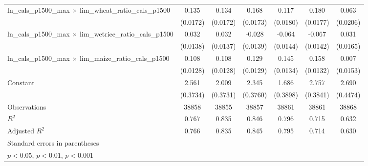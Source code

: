 {\begin{tabular}{l*{6}{c}}
\addlinespace
ln\_cals\_p1500\_max $\times$ lim\_wheat\_ratio\_cals\_p1500&       0.135\sym{***}&       0.134\sym{***}&       0.168\sym{***}&       0.117\sym{***}&       0.180\sym{***}&       0.063\sym{**} \\
                    &    (0.0172)         &    (0.0172)         &    (0.0173)         &    (0.0180)         &    (0.0177)         &    (0.0206)         \\
\addlinespace
ln\_cals\_p1500\_max $\times$ lim\_wetrice\_ratio\_cals\_p1500&       0.032\sym{*}  &       0.032\sym{*}  &      -0.028\sym{*}  &      -0.064\sym{***}&      -0.067\sym{***}&       0.031         \\
                    &    (0.0138)         &    (0.0137)         &    (0.0139)         &    (0.0144)         &    (0.0142)         &    (0.0165)         \\
\addlinespace
ln\_cals\_p1500\_max $\times$ lim\_maize\_ratio\_cals\_p1500&       0.108\sym{***}&       0.108\sym{***}&       0.129\sym{***}&       0.145\sym{***}&       0.158\sym{***}&       0.007         \\
                    &    (0.0128)         &    (0.0128)         &    (0.0129)         &    (0.0134)         &    (0.0132)         &    (0.0153)         \\
\addlinespace
Constant            &       2.561\sym{***}&       2.009\sym{***}&       2.345\sym{***}&       1.686\sym{***}&       2.757\sym{***}&       2.690\sym{***}\\
                    &    (0.3734)         &    (0.3731)         &    (0.3760)         &    (0.3898)         &    (0.3841)         &    (0.4474)         \\
\midrule
Observations        &       38858         &       38855         &       38857         &       38861         &       38861         &       38868         \\
\(R^{2}\)           &       0.767         &       0.835         &       0.846         &       0.796         &       0.715         &       0.632         \\
Adjusted \(R^{2}\)  &       0.766         &       0.835         &       0.845         &       0.795         &       0.714         &       0.630         \\
\bottomrule
\multicolumn{7}{l}{\footnotesize Standard errors in parentheses}\\
\multicolumn{7}{l}{\footnotesize \sym{*} \(p<0.05\), \sym{**} \(p<0.01\), \sym{***} \(p<0.001\)}\\
\end{tabular}
}
